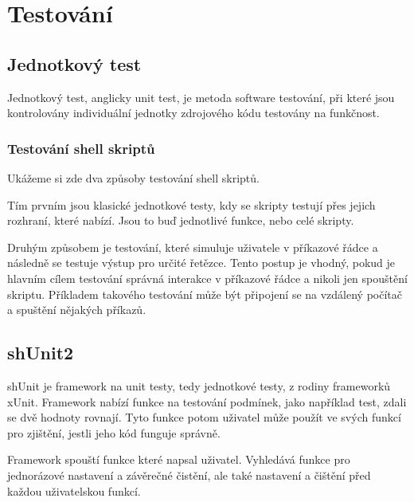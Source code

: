 \documentclass[thesis=M,czech]{FITthesis}[2012/06/26]
\begin{document}
%
%
\chapter{Testování}

%
\section{Jednotkový test}

Jednotkový test, anglicky unit test, je metoda software testování, při které jsou kontrolovány individuální jednotky zdrojového kódu testovány na funkčnost. 

%
\subsection{Testování shell skriptů}

Ukážeme si zde dva způsoby testování shell skriptů.

Tím prvním jsou klasické jednotkové testy, kdy se skripty testují přes jejich rozhraní, které nabízí. Jsou to buď jednotlivé funkce, nebo celé skripty.

Druhým způsobem je testování, které simuluje uživatele v příkazové řádce a následně se testuje výstup pro určité řetězce. Tento postup je vhodný, pokud je hlavním cílem testování správná interakce v příkazové řádce a nikoli jen spouštění skriptu. Příkladem takového testování může být připojení se na vzdálený počítač a spuštění nějakých příkazů.



\section{shUnit2}

shUnit je framework na unit testy, tedy jednotkové testy, z rodiny frameworků xUnit. Framework nabízí funkce na testování podmínek, jako například test, zdali se dvě hodnoty rovnají. Tyto funkce potom uživatel může použít ve svých funkcí pro zjištění, jestli jeho kód funguje správně.

Framework spouští funkce které napsal uživatel. Vyhledává funkce pro jednorázové nastavení a závěrečné čistění, ale také nastavení a čištění před každou uživatelskou funkcí.
\end{document}
